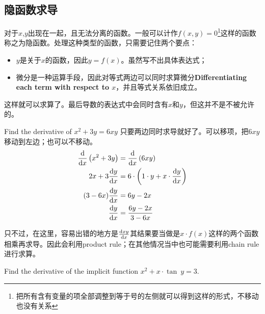 \subsection*{隐函数求导}
对于$x$,$y$出现在一起，且无法分离的函数。一般可以计作$f(x,y)=0$\footnote{把所有含有变量的项全部调整到等于号的左侧就可以得到这样的形式，不移动也没有关系}这样的函数称之为隐函数。处理这种类型的函数，只需要记住两个要点：
\begin{itemize}
	\item $y$是关于$x$的函数，因此$y=f(x)$。虽然写不出具体表达式；
	\item 微分是一种运算手段，因此对等式两边可以同时求算微分\textbf{Differentiating each term with respect to $x$}，并且等式关系依旧成立。
\end{itemize}
这样就可以求算了。最后导数的表达式中会同时含有$x$和$y$，但这并不是不被允许的。

\begin{ExampleBox}
Find the derivative of $x^2+3y=6xy$
\tcblower
只要两边同时求导就好了。可以移项，把$6xy$移动到左边；也可以不移动。
\begin{align*}
 \frac{{\mathrm{d}}}{{\mathrm{d}} x} \left(x^2+3y\right) &= \frac{{\mathrm{d}}}{{\mathrm{d}} x} \left(6xy\right)\\
 2x+3\frac{{\mathrm{d}} y}{{\mathrm{d}} x} &=6\cdot \left(1\cdot y + x\cdot \frac{{\mathrm{d}} y}{{\mathrm{d}} x}\right)\\
 (3-6x)\frac{{\mathrm{d}} y}{{\mathrm{d}} x} &=6y-2x\\
 \frac{{\mathrm{d}} y}{{\mathrm{d}} x} &=\frac{6y-2x}{3-6x}
\end{align*}
\end{ExampleBox}

只不过，在这里，容易出错的地方是$\frac{{\mathrm{d}} xy}{{\mathrm{d}} x}$其结果要当做是$x\cdot f(x)$这样的两个函数相乘再求导。因此会利用product rule；在其他情况当中也可能需要利用chain rule进行求算。
\begin{TaskBox}
Find the derivative of the implicit function $x^{2}+x\cdot \tan\ y=3$.
\end{TaskBox}